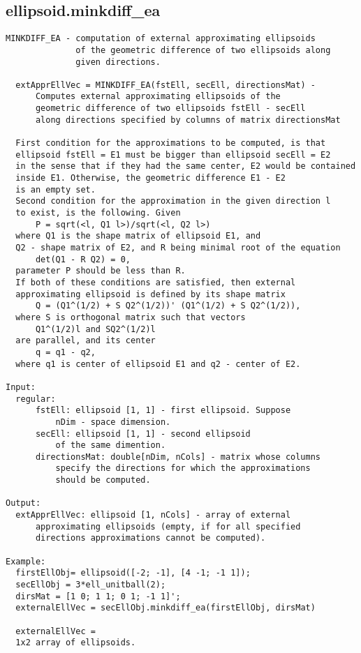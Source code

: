 \subsection{\texorpdfstring{ellipsoid.minkdiff\_ea}{minkdiff\_ea}}\label{method:ellipsoid.minkdiffea}
\begin{verbatim}
MINKDIFF_EA - computation of external approximating ellipsoids
              of the geometric difference of two ellipsoids along
              given directions.

  extApprEllVec = MINKDIFF_EA(fstEll, secEll, directionsMat) -
      Computes external approximating ellipsoids of the
      geometric difference of two ellipsoids fstEll - secEll
      along directions specified by columns of matrix directionsMat

  First condition for the approximations to be computed, is that
  ellipsoid fstEll = E1 must be bigger than ellipsoid secEll = E2
  in the sense that if they had the same center, E2 would be contained
  inside E1. Otherwise, the geometric difference E1 - E2
  is an empty set.
  Second condition for the approximation in the given direction l
  to exist, is the following. Given
      P = sqrt(<l, Q1 l>)/sqrt(<l, Q2 l>)
  where Q1 is the shape matrix of ellipsoid E1, and
  Q2 - shape matrix of E2, and R being minimal root of the equation
      det(Q1 - R Q2) = 0,
  parameter P should be less than R.
  If both of these conditions are satisfied, then external
  approximating ellipsoid is defined by its shape matrix
      Q = (Q1^(1/2) + S Q2^(1/2))' (Q1^(1/2) + S Q2^(1/2)),
  where S is orthogonal matrix such that vectors
      Q1^(1/2)l and SQ2^(1/2)l
  are parallel, and its center
      q = q1 - q2,
  where q1 is center of ellipsoid E1 and q2 - center of E2.

Input:
  regular:
      fstEll: ellipsoid [1, 1] - first ellipsoid. Suppose
          nDim - space dimension.
      secEll: ellipsoid [1, 1] - second ellipsoid
          of the same dimention.
      directionsMat: double[nDim, nCols] - matrix whose columns
          specify the directions for which the approximations
          should be computed.

Output:
  extApprEllVec: ellipsoid [1, nCols] - array of external
      approximating ellipsoids (empty, if for all specified
      directions approximations cannot be computed).

Example:
  firstEllObj= ellipsoid([-2; -1], [4 -1; -1 1]);
  secEllObj = 3*ell_unitball(2);
  dirsMat = [1 0; 1 1; 0 1; -1 1]';
  externalEllVec = secEllObj.minkdiff_ea(firstEllObj, dirsMat)

  externalEllVec =
  1x2 array of ellipsoids.
\end{verbatim}
